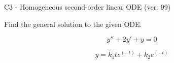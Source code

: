 \begin{exercise}
  \begin{exerciseTitle}C3 - Homogeneous second-order linear ODE (ver. 99)\end{exerciseTitle}
  \begin{exerciseStatement}
    
Find the general solution to the given ODE.

    
\[y''+2y'+y = 0\]

  \end{exerciseStatement}
  \begin{exerciseAnswer}
    
\[y= k_{1} t e^{\left(-t\right)} + k_{2} e^{\left(-t\right)}\]

  \end{exerciseAnswer}
\end{exercise}